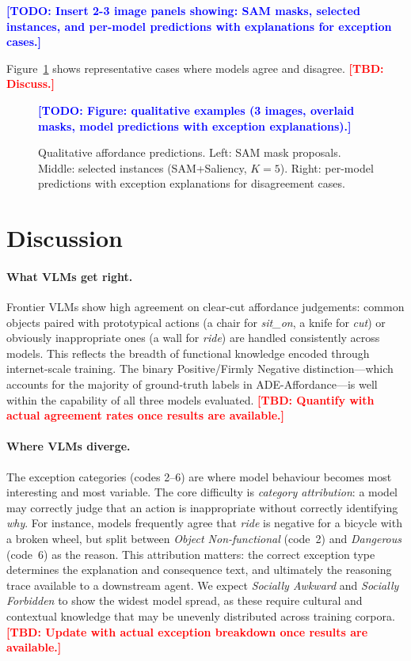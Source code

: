 \documentclass[runningheads]{llncs}
\newcommand{\TBD}[1]{\textcolor{red}{\textbf{[TBD: #1]}}}
\newcommand{\TODO}[1]{\textcolor{blue}{\textbf{[TODO: #1]}}}
\begin{document}
\TODO{Insert 2-3 image panels showing: SAM masks, selected instances, and
per-model predictions with explanations for exception cases.}

Figure~\ref{fig:qualitative} shows representative cases where models
agree and disagree. \TBD{Discuss.}

\begin{figure}[t]
  \centering
  \TODO{Figure: qualitative examples (3 images, overlaid masks, model
  predictions with exception explanations).}
  \caption{Qualitative affordance predictions. Left: SAM mask proposals.
    Middle: selected instances (SAM+Saliency, $K=5$). Right: per-model
    predictions with exception explanations for disagreement cases.}
  \label{fig:qualitative}
\end{figure}


\section{Discussion}
\label{sec:discussion}

\paragraph{What VLMs get right.}
Frontier VLMs show high agreement on clear-cut affordance judgements:
common objects paired with prototypical actions (a chair for \emph{sit\_on},
a knife for \emph{cut}) or obviously inappropriate ones (a wall for
\emph{ride}) are handled consistently across models. This reflects the
breadth of functional knowledge encoded through internet-scale training.
The binary Positive/Firmly Negative distinction—which accounts for the
majority of ground-truth labels in ADE-Affordance—is well within the
capability of all three models evaluated.
\TBD{Quantify with actual agreement rates once results are available.}

\paragraph{Where VLMs diverge.}
The exception categories (codes 2--6) are where model behaviour becomes
most interesting and most variable. The core difficulty is \emph{category
attribution}: a model may correctly judge that an action is inappropriate
without correctly identifying \emph{why}. For instance, models frequently
agree that \emph{ride} is negative for a bicycle with a broken wheel, but
split between \emph{Object Non-functional} (code~2) and \emph{Dangerous}
(code~6) as the reason. This attribution matters: the correct exception
type determines the explanation and consequence text, and ultimately the
reasoning trace available to a downstream agent. We expect \emph{Socially
Awkward} and \emph{Socially Forbidden} to show the widest model spread,
as these require cultural and contextual knowledge that may be unevenly
distributed across training corpora.
\TBD{Update with actual exception breakdown once results are available.}
\end{document}
